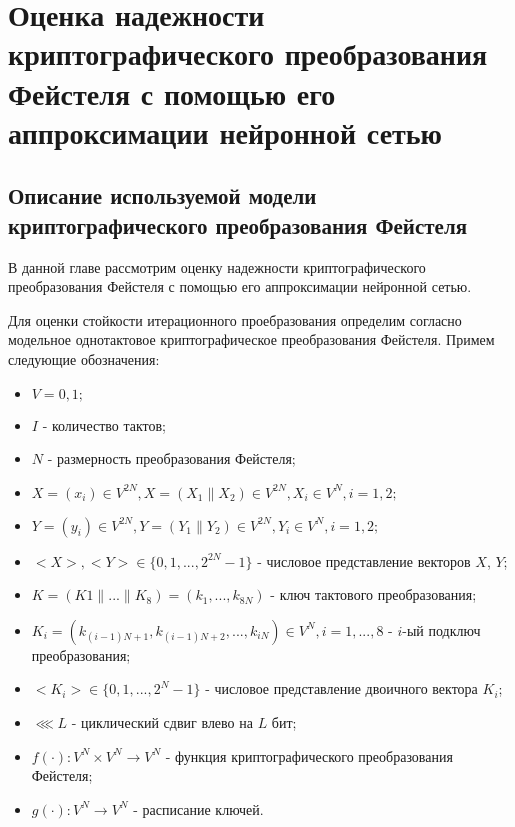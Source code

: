   \chapter{Оценка надежности криптографического преобразования Фейстеля с помощью его аппроксимации нейронной сетью}
  \label{c:chapter3}
  \section{Описание используемой модели криптографического преобразования Фейстеля}
  В данной главе рассмотрим оценку надежности криптографического преобразования Фейстеля с помощью его аппроксимации нейронной сетью.
  \bigskip
  
  Для оценки стойкости итерационного проебразования определим согласно \cite{crypto} модельное однотактовое криптографическое преобразования Фейстеля. 
  Примем следующие обозначения:
  \begin{itemize}
  	\item  $V = {0, 1};$
  	\item  $I$ - количество тактов;
  	\item  $N$ - размерность преобразования Фейстеля;
  	\item  $X = (x_i) \in V^{2N}, X = (X_1 \| X_2) \in V^{2N}, X_i \in V^N, i=1,2;$
  	\item  $Y = (y_i) \in V^{2N}, Y = (Y_1 \| Y_2) \in V^{2N}, Y_i \in V^N, i=1,2;$
  	\item  $<X>, <Y> \in \{0,1,...,2^{2N}-1\}$ - числовое представление векторов $X$, $Y$;
  	\item  $K=(K1\|...\|K_8)=(k_1,...,k_{8N})$ - ключ тактового преобразования;
  	\item  $K_i=(k_{(i-1)N+1},k_{(i-1)N+2},...,k_{iN}) \in V^{N}, i=1,...,8$ - $i$-ый подключ преобразования;
  	\item  $<K_i> \in \{0,1,...,2^{N}-1\}$ - числовое представление двоичного вектора $K_i$;
  	\item  $\lll L$ - циклический сдвиг влево на $L$ бит;
  	\item   $f(\cdot):V^N \times V^N \rightarrow V^N$ - функция криптографического преобразования Фейстеля;
  	\item $g(\cdot):V^N \rightarrow V^N$ - расписание ключей.
  \end{itemize}

\newcommand{\suma}{\Large$+$}
\newcommand{\derv}{\huge$\frac{d}{dt}$}

